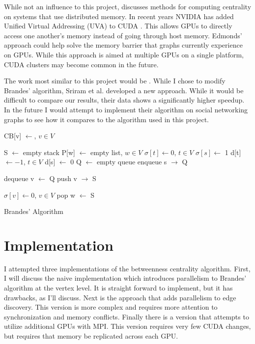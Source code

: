 \documentclass[10pt,twocolumn]{article}
\begin{document}
While not an influence to this project, \cite{distributedCentrality} discusses methods for computing centrality on systems that use distributed memory. In recent years NVIDIA has added Unified Virtual Addressing (UVA) to CUDA \cite{cudaUVA}. This allows GPUs to directly access one another's memory instead of going through host memory. Edmonds' approach could help solve the memory barrier that graphs currently experience on GPUs. While this approach is aimed at multiple GPUs on a single platform, CUDA clusters may become common in the future.

The work most similar to this project would be \cite{evalCentrality}. While I chose to modify Brandes' algorithm, Sriram et al. developed a new approach. While it would be difficult to compare our results, their data shows a significantly higher speedup. In the future I would attempt to implement their algorithm on social networking graphs to see how it compares to the algorithm used in this project.

\begin{algorithm}[h!]
CB[v] $\leftarrow$, $v \in V$\;
{
	S $\leftarrow$ empty stack\;
	P[w] $\leftarrow$ empty list, $w \in V$\;
	$\sigma [t] \leftarrow 0$, $t \in V$\; $\sigma [s] \leftarrow$ 1\;
	d[t] $\leftarrow - 1$, $t \in V$\; d[s] $\leftarrow$ 0\;
	Q $\leftarrow$ empty queue\;
	enqueue s $\rightarrow$ Q\;
	{
		dequeue v $\leftarrow$ Q\;
		push v $\rightarrow$ S\;
		{
			
		}	
	}


	$\sigma[v] \leftarrow 0$, $v \in V$\;
	{
		pop w $\leftarrow$ S\;
	}
}

\caption{Brandes' Algorithm}
\label{alg:Brande}
\end{algorithm}
 
\section{Implementation}
I attempted three implementations of the betweenness centrality algorithm. First, I will discuss the naive implementation which introduces parallelism to Brandes' algorithm at the vertex level. It is straight forward to implement, but it has drawbacks, as I'll discuss. Next is the approach that adds parallelism to edge discovery. This version is more complex and requires more attention to synchronization and memory conflicts. Finally there is a version that attempts to utilize additional GPUs with MPI. This version requires very few CUDA changes, but requires that memory be replicated across each GPU.
 
\end{document}
